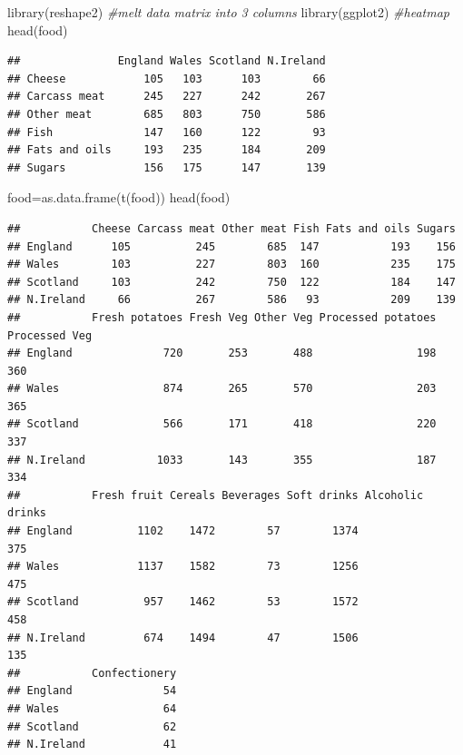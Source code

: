 \documentclass[
]{article}
\newenvironment{Shaded}{\begin{snugshade}}{\end{snugshade}}
\newcommand{\CommentTok}[1]{\textcolor[rgb]{0.56,0.35,0.01}{\textit{#1}}}
\newcommand{\FunctionTok}[1]{\textcolor[rgb]{0.00,0.00,0.00}{#1}}
\newcommand{\NormalTok}[1]{#1}
\newcommand{\OtherTok}[1]{\textcolor[rgb]{0.56,0.35,0.01}{#1}}
\theoremstyle{definition}
\theoremstyle{definition}
\theoremstyle{definition}
\theoremstyle{definition}
\theoremstyle{remark}
\begin{document}
\begin{Shaded}
\begin{Highlighting}[]
\FunctionTok{library}\NormalTok{(reshape2) }\CommentTok{\#melt data matrix into 3 columns}
\FunctionTok{library}\NormalTok{(ggplot2) }\CommentTok{\#heatmap}
\FunctionTok{head}\NormalTok{(food)}
\end{Highlighting}
\end{Shaded}

\begin{verbatim}
##               England Wales Scotland N.Ireland
## Cheese            105   103      103        66
## Carcass meat      245   227      242       267
## Other meat        685   803      750       586
## Fish              147   160      122        93
## Fats and oils     193   235      184       209
## Sugars            156   175      147       139
\end{verbatim}

\begin{Shaded}
\begin{Highlighting}[]
\NormalTok{food}\OtherTok{=}\FunctionTok{as.data.frame}\NormalTok{(}\FunctionTok{t}\NormalTok{(food))}
\FunctionTok{head}\NormalTok{(food)}
\end{Highlighting}
\end{Shaded}

\begin{verbatim}
##           Cheese Carcass meat Other meat Fish Fats and oils Sugars
## England      105          245        685  147           193    156
## Wales        103          227        803  160           235    175
## Scotland     103          242        750  122           184    147
## N.Ireland     66          267        586   93           209    139
##           Fresh potatoes Fresh Veg Other Veg Processed potatoes Processed Veg
## England              720       253       488                198           360
## Wales                874       265       570                203           365
## Scotland             566       171       418                220           337
## N.Ireland           1033       143       355                187           334
##           Fresh fruit Cereals Beverages Soft drinks Alcoholic drinks
## England          1102    1472        57        1374              375
## Wales            1137    1582        73        1256              475
## Scotland          957    1462        53        1572              458
## N.Ireland         674    1494        47        1506              135
##           Confectionery
## England              54
## Wales                64
## Scotland             62
## N.Ireland            41
\end{verbatim}
\end{document}
